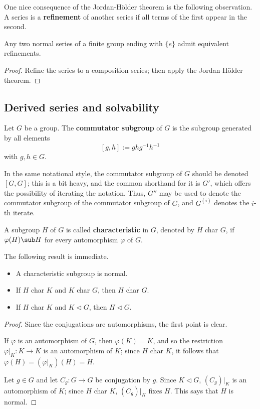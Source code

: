 One nice consequence of the Jordan-H\"older theorem is the following observation. A series is a \textbf{refinement} of another series if all terms of the first appear in the second.
\begin{proposition}
Any two normal series of a finite group ending with $\{e\}$ admit equivalent refinements.
\end{proposition}
\begin{proof}
Refine the series to a composition series; then apply the Jordan-H\"older
theorem.
\end{proof}
\subsection{Derived series and solvability}
\begin{definition}
Let $G$ be a group. The \textbf{commutator subgroup} of $G$ is the subgroup generated by all elements
\[[g,h]:=ghg^{-1}h^{-1}\]
with $g,h\in G$.
\end{definition}
In the same notational style, the commutator subgroup of $G$ should be denoted $[G,G]$; this is a bit heavy, and the common 
shorthand for it is $G'$, which offers the possibility of iterating the notation. Thus, $G''$ may be used to 
denote the commutator subgroup of the commutator subgroup of $G$, and $G^{(i)}$ denotes the $i$-th
iterate.\par
\begin{definition}
A subgroup $H$ of $G$ is called \textbf{characteristic} in $G$, denoted by $H$ char $G$, if $\varphi(H)\sub H$ for every automorphism $\varphi$ of $G$.
\end{definition}
The following result is immediate.
\begin{lemma}
\mbox{}
\begin{itemize}
\item A characteristic subgroup is normal.
\item If $H$ char $K$ and $K$ char $G$, then $H$ char $G$.
\item If $H$ char $K$ and $K\lhd G$, then $H\lhd G$.
\end{itemize}
\end{lemma}
\begin{proof}
Since the conjugations are automorphisms, the first point is clear.\par
If $\varphi$ is an automorphism of $G$, then $\varphi(K)=K$, and so the restriction $\varphi|_K:K\to K$ is an automorphism 
of $K$; since $H$ char $K$, it follows that $\varphi(H)=(\varphi|_K)(H)=H$.\par
Let $g\in G$ and let $C_g:G\to G$ be conjugation by $g$. Since $K\lhd G$, $(C_g)|_K$ is an automorphism of $K$; since $H$ char $K$, 
$(C_g)|_K$ fixes $H$. This says that $H$ is normal.
\end{proof}
